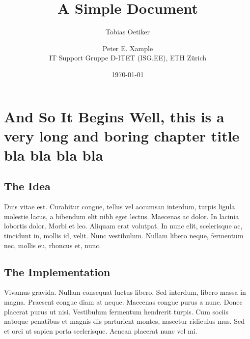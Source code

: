\documentclass[a4paper,12pt]{book}
\title{A Simple Document}
\date{\today}
\author{Tobias Oetiker\and Peter E. Xample\\
IT Support Gruppe D-ITET (ISG.EE), ETH Z\"urich}
\begin{document}
\maketitle

\tableofcontents

\chapter[Short Title]{And So It Begins Well, this is a very long and boring chapter title bla bla bla bla}


\section{The Idea}
Duis vitae est. Curabitur congue, tellus vel accumsan interdum, turpis
ligula molestie lacus, a bibendum elit nibh eget lectus. Maecenas ac
dolor. In lacinia lobortis dolor. Morbi et leo. Aliquam erat
volutpat. In nunc elit, scelerisque ac, tincidunt in, mollis id,
velit. Nunc vestibulum. Nullam libero neque, fermentum nec, mollis eu,
rhoncus et, nunc. 

\section{The Implementation}


Vivamus gravida. Nullam consequat luctus libero. Sed interdum, libero
massa in magna. Praesent congue diam at neque. Maecenas congue purus a
nunc. Donec placerat purus ut nisi. Vestibulum fermentum hendrerit
turpis. Cum sociis natoque penatibus et magnis dis parturient montes,
nascetur ridiculus mus. Sed et orci ut sapien porta
scelerisque. Aenean placerat nunc vel mi. 
\end{document}
